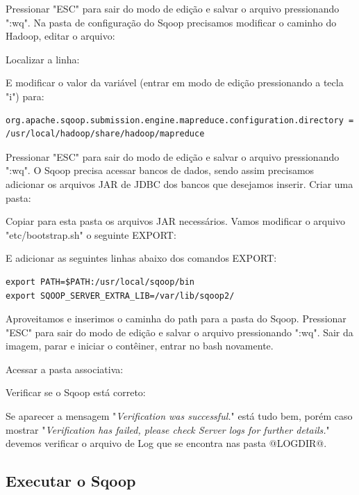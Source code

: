 \documentclass[a4paper,11pt]{article}
\begin{document}
Pressionar "ESC" para sair do modo de edição e salvar o arquivo pressionando ":wq". Na pasta de configuração do Sqoop precisamos modificar o caminho do Hadoop, editar o arquivo: \\

Localizar a linha: \\

E modificar o valor da variável (entrar em modo de edição pressionando a tecla "i") para:
\begin{lstlisting}[]
org.apache.sqoop.submission.engine.mapreduce.configuration.directory = /usr/local/hadoop/share/hadoop/mapreduce
\end{lstlisting}

Pressionar "ESC" para sair do modo de edição e salvar o arquivo pressionando ":wq". O Sqoop precisa acessar bancos de dados, sendo assim precisamos adicionar os arquivos JAR de JDBC dos bancos que desejamos inserir. Criar uma pasta: \\

Copiar para esta pasta os arquivos JAR necessários. Vamos modificar o arquivo "etc/bootstrap.sh" o seguinte EXPORT: \\

E adicionar as seguintes linhas abaixo dos comandos EXPORT:
\begin{lstlisting}[]
export PATH=$PATH:/usr/local/sqoop/bin
export SQOOP_SERVER_EXTRA_LIB=/var/lib/sqoop2/
\end{lstlisting}

Aproveitamos e inserimos o caminha do path para a pasta do Sqoop. Pressionar "ESC" para sair do modo de edição e salvar o arquivo pressionando ":wq".  Sair da imagem, parar e iniciar o contêiner, entrar no bash novamente.

Acessar a pasta associativa: \\

Verificar se o Sqoop está correto: \\

Se aparecer a mensagem "\textit{Verification was successful.}" está tudo bem, porém caso mostrar "\textit{Verification has failed, please check Server logs for further details.}" devemos verificar o arquivo de Log que se encontra nas pasta @LOGDIR@.

\subsection{Executar o Sqoop}
\end{document}

